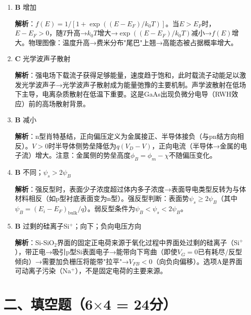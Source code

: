 \documentclass[12pt,a4paper]{ctexart}
\begin{document}
\begin{enumerate}[label=\arabic*.,nosep,leftmargin=2em]
\textbf{解析}：p型半导体$p_0 = N_v\exp(-(E_F-E_v)/k_0T) \approx N_A$。$N_A$增大→$p_0$增大→$E_F-E_v$减小→$E_F$向$E_v$移动。n型半导体则$E_F$随$N_D$增大向$E_c$移动。$E_F$位置是掺杂浓度的直接反映。

\item \textbf{B} 增加

\textbf{解析}：$f(E) = 1/[1+\exp((E-E_F)/k_0T)]$。当$E > E_F$时，$E-E_F > 0$，随$T$升高→$k_0T$增大→$\exp((E-E_F)/k_0T)$减小→$f(E)$增大。物理图像：温度升高→费米分布"尾巴"上翘→高能态被占据概率增大。

\item \textbf{C} 光学波声子散射

\textbf{解析}：强电场下载流子获得足够能量，速度趋于饱和，此时载流子动能足以激发光学波声子→光学波声子散射成为能量弛豫的主要机制。声学波散射在低场下主导，电离杂质散射在低温下重要。这是GaAs出现负微分电导（RWH效应）前的高场散射背景。

\item \textbf{B} 减小

\textbf{解析}：n型肖特基结，正向偏压定义为金属接正、半导体接负（与pn结方向相反）。$V > 0$时半导体侧势垒降低为$q(V_D - V)$，正向电流（半导体→金属的电子流）增大。注意：金属侧的势垒高度$\phi_B = \phi_m - \chi$不随偏压变化。

\item \textbf{B} 不同；$\psi_s > 2\psi_B$

\textbf{解析}：强反型时，表面少子浓度超过体内多子浓度→表面导电类型反转为与体材料相反（如p型衬底表面变为n型）。强反型判断：表面势$\psi_s \ge 2\psi_B$（其中$\psi_B = (E_i - E_F)_{\text{bulk}}/q$）。弱反型条件为$\psi_B < \psi_s < 2\psi_B$。

\item \textbf{B} 过剩的硅离子Si$^+$；向下；负向电压方向

\textbf{解析}：Si-SiO$_2$界面的固定正电荷来源于氧化过程中界面处过剩的硅离子（Si$^+$），带正电→吸引p型Si表面电子→能带向下弯曲（即使$V_G=0$已有耗尽/反型倾向）→需要加负栅压将能带"拉平"→$V_{FB} < 0$（向负向偏移）。选项A是界面可动离子污染（Na$^+$），不是固定电荷的主要来源。

\end{enumerate}

\newpage

\section*{二、填空题（6$\times$4 = 24分）}
\end{document}
